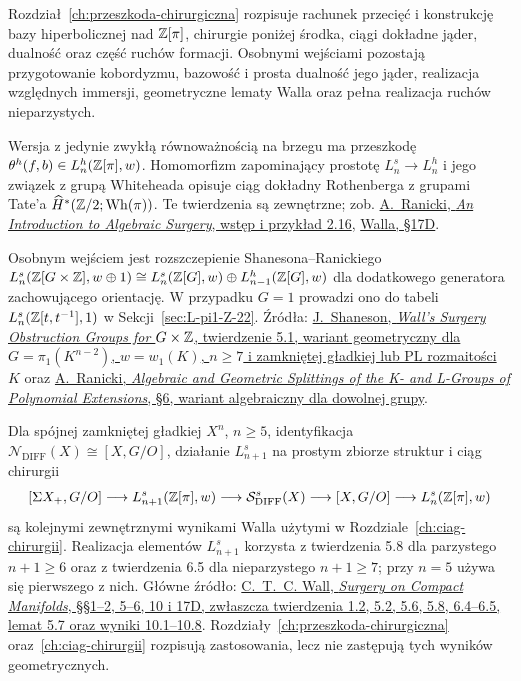 \begin{description}[leftmargin=2.9cm,style=nextline]
  Rozdział~\ref{ch:przeszkoda-chirurgiczna}
  rozpisuje rachunek przecięć i konstrukcję
  bazy hiperbolicznej nad $\mathbb{Z}[\pi]$,
  chirurgie poniżej środka, ciągi dokładne jąder,
  dualność oraz część ruchów formacji. Osobnymi
  wejściami pozostają przygotowanie kobordyzmu,
  bazowość i prosta dualność jego jąder,
  realizacja względnych immersji, geometryczne lematy
  Walla oraz pełna realizacja ruchów nieparzystych.

  Wersja z jedynie zwykłą równoważnością na brzegu ma
  przeszkodę $\theta^h(f,b)\in L_n^h(\mathbb{Z}[\pi],w)$.
  Homomorfizm zapominający prostotę
  $L_n^s\to L_n^h$ i jego związek z grupą
  Whiteheada opisuje ciąg dokładny Rothenberga z grupami
  Tate'a $\widehat H^*(\mathbb{Z}/2;\operatorname{Wh}(\pi))$.
  Te twierdzenia są zewnętrzne; zob.
  \href{https://www.maths.ed.ac.uk/~v1ranick/surgery/ranicki.pdf}
  {A.\ Ranicki, \emph{An Introduction to Algebraic Surgery},
  wstęp i przykład 2.16},
  \href{https://webhomes.maths.ed.ac.uk/~v1ranick/books/scm.pdf}
  {Walla, §17D}.

  Osobnym wejściem jest rozszczepienie Shanesona--Ranickiego
  $L_n^s(\mathbb{Z}[G\times\mathbb{Z}],w\oplus1)
   \cong L_n^s(\mathbb{Z}[G],w)\oplus L_{n-1}^h(\mathbb{Z}[G],w)$
  dla dodatkowego generatora zachowującego orientację.
  W przypadku $G=1$ prowadzi ono do tabeli
  $L_n^s(\mathbb{Z}[t,t^{-1}],1)$ w
  Sekcji~\ref{sec:L-pi1-Z-22}. Źródła:
  \href{https://webhomes.maths.ed.ac.uk/~v1ranick/papers/shan.pdf}
  {J.\ Shaneson, \emph{Wall's Surgery Obstruction Groups
  for $G\times\mathbb{Z}$}, twierdzenie 5.1, wariant geometryczny
  dla $G=\pi_1(K^{n-2})$, $w=w_1(K)$, $n\geq7$
  i zamkniętej gładkiej lub PL rozmaitości $K$} oraz
  \href{https://webhomes.maths.ed.ac.uk/~v1ranick/papers/splitkl.pdf}
  {A.\ Ranicki, \emph{Algebraic and Geometric Splittings
  of the K- and L-Groups of Polynomial Extensions}, §6,
  wariant algebraiczny dla dowolnej grupy}.

  Dla spójnej zamkniętej gładkiej $X^n$, $n\geq5$,
  identyfikacja $\mathcal N_{\mathrm{DIFF}}(X)\cong[X,G/O]$,
  działanie $L_{n+1}^s$ na prostym zbiorze struktur i ciąg
  chirurgii
  \[
   [\Sigma X_+,G/O]\longrightarrow
   L_{n+1}^s(\mathbb{Z}[\pi],w)
   \longrightarrow\mathcal S^s_{\mathrm{DIFF}}(X)
   \longrightarrow[X,G/O]\longrightarrow
   L_n^s(\mathbb{Z}[\pi],w)
  \]
  są kolejnymi zewnętrznymi wynikami Walla użytymi w
  Rozdziale~\ref{ch:ciag-chirurgii}. Realizacja elementów
  $L_{n+1}^s$ korzysta z twierdzenia 5.8 dla parzystego
  $n+1\geq6$ oraz z twierdzenia 6.5 dla nieparzystego
  $n+1\geq7$; przy $n=5$ używa się pierwszego z nich.
  Główne źródło:
  \href{https://webhomes.maths.ed.ac.uk/~v1ranick/books/scm.pdf}
  {C.~T.~C. Wall, \emph{Surgery on Compact
  Manifolds}, §§1--2, 5--6, 10 i 17D,
  zwłaszcza twierdzenia 1.2, 5.2, 5.6, 5.8,
  6.4--6.5, lemat 5.7 oraz wyniki 10.1--10.8}.
  Rozdziały~\ref{ch:przeszkoda-chirurgiczna}
  oraz~\ref{ch:ciag-chirurgii} rozpisują zastosowania,
  lecz nie zastępują tych wyników geometrycznych.


\end{description}
